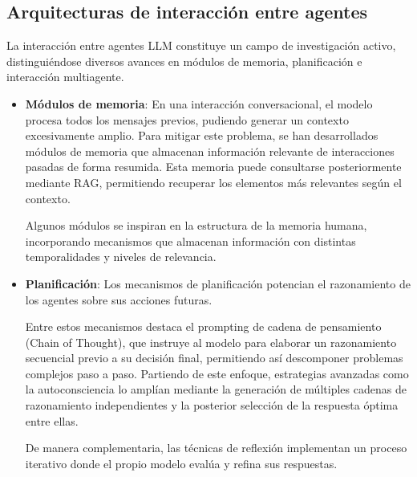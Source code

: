 



\subsection{Arquitecturas de interacción entre agentes}
La interacción entre agentes LLM constituye un campo de investigación activo, distinguiéndose diversos avances en módulos de memoria, planificación e interacción multiagente\cite{wang_survey_2024}.
\begin{itemize}
  \item{\textbf{Módulos de memoria}}: En una interacción conversacional, el modelo procesa todos los mensajes previos, pudiendo generar un contexto excesivamente amplio. Para mitigar este problema, se han desarrollados módulos de memoria que almacenan información relevante de interacciones pasadas de forma resumida\cite{zhang_building_2024}\cite{fischer_reflective_2023}\cite{liang_unleashing_2023}. Esta memoria puede consultarse posteriormente mediante RAG, permitiendo recuperar los elementos más relevantes según el contexto\cite{zhao_expel_2024}.

Algunos módulos se inspiran en la estructura de la memoria humana\cite{zhong_memorybank_2024}, incorporando mecanismos que almacenan información con distintas temporalidades y niveles de relevancia\cite{wang_survey_2024}\cite{park_generative_2023}.


\item{\textbf{Planificación}}: Los mecanismos de planificación potencian el razonamiento de los agentes sobre sus acciones futuras.

Entre estos mecanismos destaca el prompting de cadena de pensamiento (Chain of Thought)\cite{wei_chain--thought_2022}\cite{kojima_large_2022}, que instruye al modelo para elaborar un razonamiento secuencial previo a su decisión final, permitiendo así descomponer problemas complejos paso a paso.
Partiendo de este enfoque, estrategias avanzadas como la autoconsciencia\cite{liang_unleashing_2023} lo amplían mediante la generación de múltiples cadenas de razonamiento independientes y la posterior selección de la respuesta óptima entre ellas\cite{yao_tree_nodate}\cite{wang_recmind_2024}.

De manera complementaria, las técnicas de reflexión\cite{shinn_reflexion_nodate}\cite{shinn_reflexion_nodate}\cite{madaan_self-refine_nodate}\cite{miao_selfcheck_2023} implementan un proceso iterativo donde el propio modelo evalúa y refina sus respuestas.


\end{itemize}
